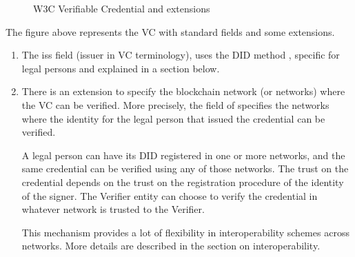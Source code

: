 \documentclass[letterpaper,10pt,english]{sphinxmanual}
\begin{document}
\begin{figure}[htbp]
\centering
\capstart

\noindent{}
\caption{W3C Verifiable Credential and extensions}\label{\detokenize{privacycred:id9}}\end{figure}

\sphinxAtStartPar
The figure above represents the VC with standard fields and some extensions.
\begin{enumerate}
%
\item {} 
\sphinxAtStartPar
The iss field (issuer in VC terminology), uses the DID method , specific for legal persons and explained in a section below.

\item {} 
\sphinxAtStartPar
There is an extension to specify the blockchain network (or networks) where the VC can be verified. More precisely, the  field of  specifies the networks where the identity for the legal person that issued the credential can be verified.

\sphinxAtStartPar
A legal person can have its  DID registered in one or more networks, and the same credential can be verified using any of those networks. The trust on the credential depends on the trust on the registration procedure of the identity of the signer. The Verifier entity can choose to verify the credential in whatever network is trusted to the Verifier.

\sphinxAtStartPar
This mechanism provides a lot of flexibility in interoperability schemes across networks. More details are described in the section on interoperability.

\end{enumerate}
\end{document}
